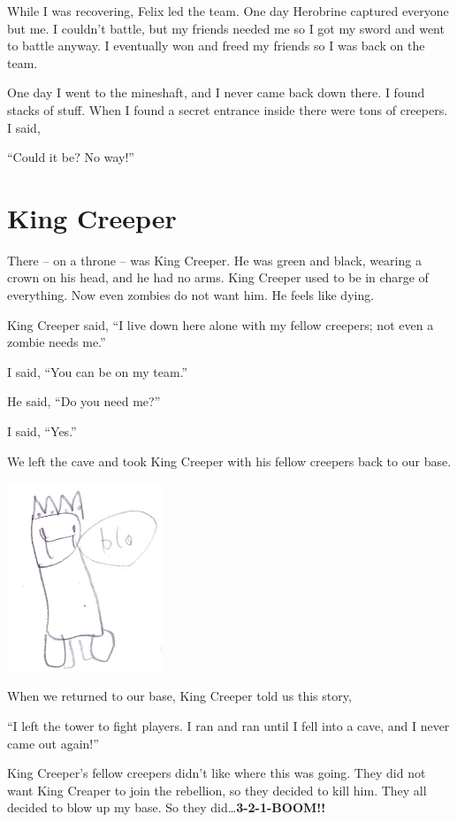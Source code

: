 \documentclass[12pt,oneside]{krantz}
\begin{document}
While I was recovering, Felix led the team. One day Herobrine captured
everyone but me. I couldn't battle, but my friends needed me so I got my
sword and went to battle anyway. I eventually won and freed my friends
so I was back on the team.

One day I went to the mineshaft, and I never came back down there. I
found stacks of stuff. When I found a secret entrance inside there were
tons of creepers. I said,

``Could it be? No way!''

\hypertarget{king-creeper}{%
\chapter{King Creeper}\label{king-creeper}}

There -- on a throne -- was King Creeper. He was green and black,
wearing a crown on his head, and he had no arms. King Creeper used to be
in charge of everything. Now even zombies do not want him. He feels like
dying.

King Creeper said, ``I live down here alone with my fellow creepers; not
even a zombie needs me.''

I said, ``You can be on my team.''

He said, ``Do you need me?''

I said, ``Yes.''

We left the cave and took King Creeper with his fellow creepers back to
our base.

\includegraphics[width=1.82292in,height=\textheight]{img/final-war/king-creeper.jpg}

When we returned to our base, King Creeper told us this story,

``I left the tower to fight players. I ran and ran until I fell into a
cave, and I never came out again!''

\clearpage

King Creeper's fellow creepers didn't like where this was going. They
did not want King Creaper to join the rebellion, so they decided to kill
him. They all decided to blow up my base. So they
did\ldots{}\textbf{3-2-1-BOOM!!}
\end{document}

